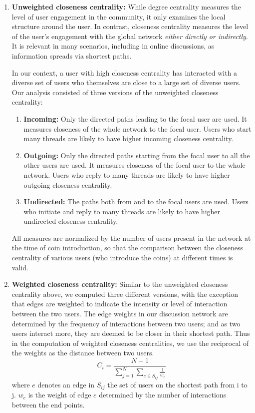 \begin{enumerate}[topsep=0pt,itemsep=-0.5ex,partopsep=1ex,parsep=1ex]
  \item \textbf{Unweighted closeness centrality:} While degree centrality measures the level of user engagement in the community, it only examines the local structure around the user.  In contrast, closeness centrality measures the level of the user's engagement with the global network \textit{either directly or indirectly}. It is relevant in many scenarios, including in online discussions, as information spreads via shortest paths. 
  
  In our context, a user with high closeness centrality has interacted with a diverse set of users who themselves are close to a large set of diverse users.  Our analysis consisted of three versions of the unweighted closeness centrality:
  \begin{enumerate}[topsep=0pt,itemsep=-0.5ex,partopsep=1ex,parsep=1ex]
    \item \textbf{Incoming:} Only the directed paths leading to the focal user are used. It measures closeness of the whole network to the focal user. Users who start many threads are likely to have higher incoming closeness centrality.
    \item \textbf{Outgoing:} Only the directed paths starting from the focal user to all the other users are used. It measures closeness of the focal user to the whole network. Users who reply to many threads are likely to have higher outgoing closeness centrality.
    \item \textbf{Undirected:} The paths both from and to the focal users are used. Users who initiate and reply to many threads are likely to have higher undirected closeness centrality.
  \end{enumerate} 
  All measures are normalized by the number of users present in the network at the time of coin introduction, so that the comparison between the closeness centrality of various users (who introduce the coins) at different times  is valid. 
  \item \textbf{Weighted closeness centrality:} Similar to the unweighted closeness centrality above, we computed three different versions, with the exception that edges are weighted to indicate the intensity or level of interaction between the two users. The edge weights in our discussion network are determined by the frequency of interactions between two users; and as two users interact more, they are deemed to be closer in their shortest path. Thus in the computation of weighted closeness centralities, we use the reciprocal of the weights as the distance between two users.
  \begin{equation}
    C_{i} = \frac{N-1}{\sum_{j=1}^{N}\sum_{e \in S_{ij}} \frac{1}{w_{e}}}
  \end{equation}
  where $e$ denotes an edge in $S_{ij}$ the set of users on the shortest path from i to j. $w_e$ is the weight of edge $e$ determined by the number of interactions between the end points.
  

\end{enumerate}
